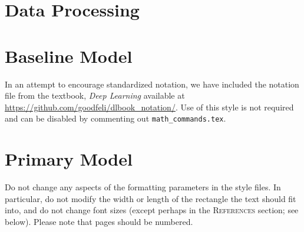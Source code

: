 \documentclass{article} %
\begin{document}
\section{Data Processing}
\label{headings}

\section{Baseline Model}

In an attempt to encourage standardized notation, we have included the
notation file from the textbook, \textit{Deep Learning}
\cite{goodfellow2016deep} available at
\url{https://github.com/goodfeli/dlbook_notation/}.  Use of this style
is not required and can be disabled by commenting out
\texttt{math\_commands.tex}.




\section{Primary Model}
Do not change any aspects of the formatting parameters in the style files.
In particular, do not modify the width or length of the rectangle the text
should fit into, and do not change font sizes (except perhaps in the
\textsc{References} section; see below). Please note that pages should be
numbered.

\label{last_page}



\end{document}
